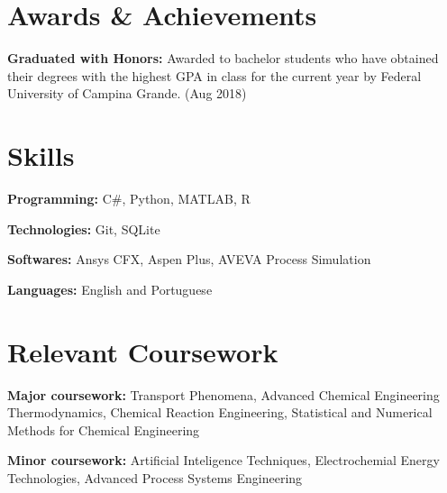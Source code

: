 \documentclass[letterpaper,11pt]{article}
\newcommand{\resumeSubHeadingListStart}{\begin{itemize}[leftmargin=0.15in, label={}]}
\newcommand{\resumeSubHeadingListEnd}{\end{itemize}}
\begin{document}

\section{Awards \& Achievements}
  \vspace{2pt}
  \resumeSubHeadingListStart
    \small{\item{
        \textbf{Graduated with Honors:}{ Awarded to bachelor students who have obtained their degrees with the highest GPA in class for the current year by Federal University of Campina Grande. (Aug 2018)} \\ \vspace{3pt}
    }}
  \resumeSubHeadingListEnd


\section{Skills}
  \vspace{2pt}
  \resumeSubHeadingListStart
    \small{\item{
        
        \textbf{Programming:}{ C\#, Python, MATLAB, R} \\ \vspace{3pt}
        
        \textbf{Technologies:}{ Git, SQLite} \\ \vspace{3pt}

        \textbf{Softwares:}{ Ansys CFX, Aspen Plus, AVEVA Process Simulation} \\ \vspace{3pt}

        \textbf{Languages:}{ English and Portuguese} \\ \vspace{3pt}
    }}
  \resumeSubHeadingListEnd  


\section{Relevant Coursework}
\vspace{2pt}
\resumeSubHeadingListStart
  \small{\item{
      \textbf{Major coursework:}{ Transport Phenomena, Advanced Chemical Engineering Thermodynamics, Chemical Reaction Engineering, Statistical and Numerical Methods for Chemical Engineering} \\ \vspace{3pt}
      
      \textbf{Minor coursework:}{ Artificial Inteligence Techniques, Electrochemial Energy Technologies, Advanced Process Systems Engineering}
  }}
\resumeSubHeadingListEnd
\end{document}
